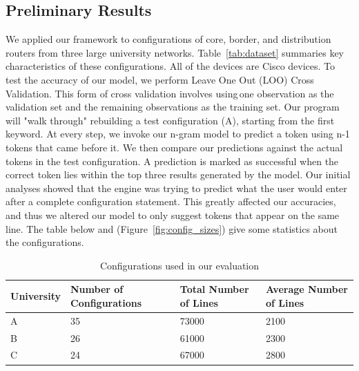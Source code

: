 \subsection{Preliminary Results}

We applied our framework to configurations of core, border, and distribution routers from three large university networks. Table~\ref{tab:dataset} summaries key characteristics of these configurations. All of the devices are Cisco devices. To test the accuracy of our model, we perform Leave One Out (LOO) Cross Validation. This form of cross validation involves using one observation as the validation set and the remaining observations as the training set. Our program will "walk through" rebuilding a test configuration (A), starting from the first keyword. At every step, we invoke our n-gram model to predict a token using n-1 tokens that came before it. We then compare our predictions against the actual tokens in the test configuration. A prediction is marked as successful when the correct token lies within the top three results generated by the model. Our initial analyses showed that the engine was trying to predict what the user would enter after a complete configuration statement. This greatly affected our accuracies, and thus we altered our model to only suggest tokens that appear on the same line. The table below and (Figure~\ref{fig:config_sizes}) give some statistics about the configurations.

\begin{table}
    \small
    \begin{tabular}{ | p{1.5cm} | p{1.5cm}| p{2cm} |  p{1.5cm} |} 
    \hline
    University & Number of Configurations & Total Number of Lines & Average Number of Lines \\ \hline
    A & 35 & 73000 & 2100 \\  \hline
    B & 26 & 61000 & 2300 \\ \hline
    C & 24 & 67000 & 2800 \\  \hline
    \end{tabular}
    \caption{Configurations used in our evaluation}
    \label{tab:datasets}
\end{table}

